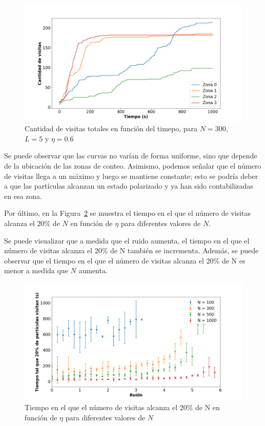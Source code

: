 \documentclass[11pt, a4paper]{article}
\begin{document}
            \begin{figure}[H]
                \centering
                \includegraphics[width=\textwidth]{./visits_vs_time_pbc-n300-eta0p6}
                \caption{Cantidad de visitas totales en función del timepo, para $N = 300$, $L = 5$ y $\eta = 0.6$}
                \label{fig:visitas_pbc_2}
            \end{figure}

            Se puede observar que las curvas no varían de forma uniforme, sino que depende de la ubicación de las zonas de conteo.
            Asimismo, podemos señalar que el número de visitas llega a un máximo y luego se mantiene constante; esto se
            podría deber a que las partículas alcanzan un estado polarizado y ya han sido contabilizadas en esa zona.

            Por último, en la Figura~\ref{fig:visitas_pbc_3} se muestra el tiempo en el que el número de visitas alcanza
            el 20\% de $N$ en función de $\eta$ para diferentes valores de $N$.

            Se puede visualizar que a medida que el ruido aumenta, el tiempo en el que el número de visitas alcanza
            el 20\% de N también se incrementa.
            Además, se puede observar que el tiempo en el que el número de visitas alcanza el 20\% de N es menor a medida que $N$ aumenta.

            \begin{figure}[H]
                \centering
                \includegraphics[width=\textwidth]{./threshold_vs_eta-pbc}
                \caption{Tiempo en el que el número de visitas alcanza el 20\% de N en función de $\eta$ para diferentes valores de $N$}
                \label{fig:visitas_pbc_3}
            \end{figure}
\end{document}
